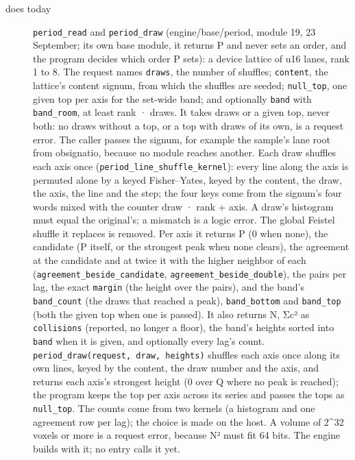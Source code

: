 \begin{description}
\item[{does today}] \texttt{period\_\allowbreak{}read} and \texttt{period\_\allowbreak{}draw} (engine/base/period, module 19, 23 September; its own base module, it returns P and never sets an order, and the program decides which order P sets): a device lattice of u16 lanes, rank 1 to 8. The request names \texttt{draws}, the number of shuffles; \texttt{content}, the lattice's content signum, from which the shuffles are seeded; \texttt{null\_\allowbreak{}top}, one given top per axis for the set-wide band; and optionally \texttt{band} with \texttt{band\_\allowbreak{}room}, at least rank · draws. It takes draws or a given top, never both: no draws without a top, or a top with draws of its own, is a request error. The caller passes the signum, for example the sample's lane root from obsignatio, because no module reaches another. Each draw shuffles each axis once (\texttt{period\_\allowbreak{}line\_\allowbreak{}shuffle\_\allowbreak{}kernel}): every line along the axis is permuted alone by a keyed Fisher–Yates, keyed by the content, the draw, the axis, the line and the step; the four keys come from the signum's four words mixed with the counter draw · rank + axis. A draw's histogram must equal the original's; a mismatch is a logic error. The global Feistel shuffle it replaces is removed. Per axis it returns P (0 when none), the candidate (P itself, or the strongest peak when none clears), the agreement at the candidate and at twice it with the higher neighbor of each (\texttt{agreement\_\allowbreak{}beside\_\allowbreak{}candidate}, \texttt{agreement\_\allowbreak{}beside\_\allowbreak{}double}), the pairs per lag, the exact \texttt{margin} (the height over the pairs), and the band's \texttt{band\_\allowbreak{}count} (the draws that reached a peak), \texttt{band\_\allowbreak{}bottom} and \texttt{band\_\allowbreak{}top} (both the given top when one is passed). It also returns N, Σc² as \texttt{collisions} (reported, no longer a floor), the band's heights sorted into \texttt{band} when it is given, and optionally every lag's count. \texttt{period\_\allowbreak{}draw(request, draw, heights)} shuffles each axis once along its own lines, keyed by the content, the draw number and the axis, and returns each axis's strongest height (0 over Q where no peak is reached); the program keeps the top per axis across its series and passes the tops as \texttt{null\_\allowbreak{}top}. The counts come from two kernels (a histogram and one agreement row per lag); the choice is made on the host. A volume of 2\textasciicircum{}32 voxels or more is a request error, because N² must fit 64 bits. The engine builds with it; no entry calls it yet.

\end{description}
